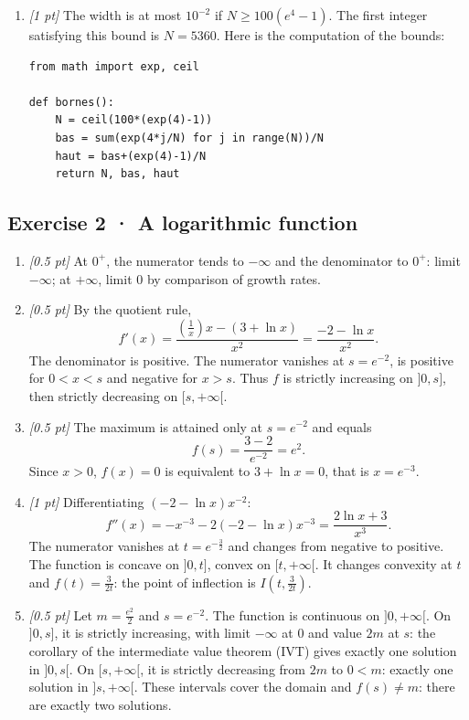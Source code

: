 \begin{enumerate}

\item \textit{[1 pt]} The width is at most $10^{-2}$ if $N\ge100(e^{4}-1)$. The first integer satisfying this bound is $N=5360$. Here is the computation of the bounds:
\begin{lstlisting}
from math import exp, ceil

def bornes():
    N = ceil(100*(exp(4)-1))
    bas = sum(exp(4*j/N) for j in range(N))/N
    haut = bas+(exp(4)-1)/N
    return N, bas, haut
\end{lstlisting}


\end{enumerate}

\subsection*{Exercise 2 · A logarithmic function}\begin{enumerate}

\item \textit{[0.5 pt]} At $0^+$, the numerator tends to $-\infty$ and the denominator to $0^+$: limit $-\infty$; at $+\infty$, limit $0$ by comparison of growth rates.

\item \textit{[0.5 pt]} By the quotient rule,
\[f'(x)=\frac{(\frac{1}{x})x-(3+\ln x)}{x^2}=\frac{-2-\ln x}{x^2}.\]
The denominator is positive. The numerator vanishes at $s=e^{-2}$, is positive for $0<x<s$ and negative for $x>s$. Thus $f$ is strictly increasing on $]0,s]$, then strictly decreasing on $[s,+\infty[$.

\item \textit{[0.5 pt]} The maximum is attained only at $s=e^{-2}$ and equals
\[f(s)=\frac{3- 2}{e^{-2}}=e^{2}.\]
Since $x>0$, $f(x)=0$ is equivalent to $3+\ln x=0$, that is $x=e^{-3}$.

\item \textit{[1 pt]} Differentiating $(-2-\ln x)x^{-2}$:
\[f''(x)=-x^{-3}-2(-2-\ln x)x^{-3}=\frac{2\ln x+3}{x^3}.\]
The numerator vanishes at $t=e^{-\frac{3}{2}}$ and changes from negative to positive. The function is concave on $]0,t]$, convex on $[t,+\infty[$. It changes convexity at $t$ and $f(t)=\frac{3}{2t}$: the point of inflection is $I(t,\frac{3}{2t})$.

\item \textit{[0.5 pt]} Let $m=\frac{e^{2}}{2}$ and $s=e^{-2}$. The function is continuous on $]0,+\infty[$. On $]0,s]$, it is strictly increasing, with limit $-\infty$ at $0$ and value $2m$ at $s$: the corollary of the intermediate value theorem (IVT) gives exactly one solution in $]0,s[$. On $[s,+\infty[$, it is strictly decreasing from $2m$ to $0<m$: exactly one solution in $]s,+\infty[$. These intervals cover the domain and $f(s)\ne m$: there are exactly two solutions.


\end{enumerate}
